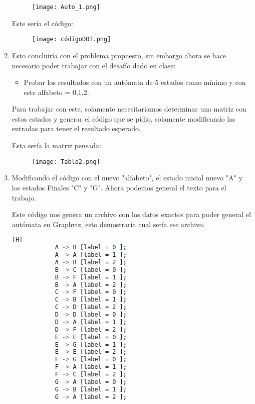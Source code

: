 \documentclass{article}
\begin{document}
\begin{enumerate}
        \begin{figure}[h]
           \centering
           \texttt{[image: Auto\_1.png]}
        \end{figure}

        Este sería el código:

        \begin{figure}[h]
           \centering
           \texttt{[image: códigoDOT.png]}
        \end{figure}

        \item Esto concluiría con el problema propuesto, sin embargo ahora se hace necesario poder trabajar con el desafío dado en clase:
          \begin{itemize}
              \item Probar los resultados con un autómata de 5 estados como mínimo y con este alfabeto = {0,1,2}.
          \end{itemize}

          Para trabajar con este, solamente necesitariamos determinar una matriz con estos estados y generar el código que se pidio, solamente modificando las entradas para tener el resultado esperado.

          \newpage

          Esta sería la matriz pensada:
          
          \begin{figure}[h]
           \centering
           \texttt{[image: Tabla2.png]}
        \end{figure}

        \item Modificando el código con el nuevo "alfabeto", el estado inicial nuevo "A" y los estados Finales "C" y "G". Ahora podemos general el texto para el trabajo.

        

        Este código nos genera un archivo con los datos exactos para poder general el autómata en Graphviz, esto demostraría cual sería ese archivo.
        
        \begin{lstlisting}[language=bash,caption={Definición del resultado esperado para Graphviz v.2 (7 Estados)}][H]
            A -> B [label = 0 ];
            A -> A [label = 1 ];
            A -> B [label = 2 ];
            B -> C [label = 0 ];
            B -> F [label = 1 ];
            B -> A [label = 2 ];
            C -> F [label = 0 ];
            C -> B [label = 1 ];
            C -> D [label = 2 ];
            D -> D [label = 0 ];
            D -> A [label = 1 ];
            D -> F [label = 2 ];
            E -> E [label = 0 ];
            E -> G [label = 1 ];
            E -> E [label = 2 ];
            F -> G [label = 0 ];
            F -> A [label = 1 ];
            F -> C [label = 2 ];
            G -> A [label = 0 ];
            G -> B [label = 1 ];
            G -> A [label = 2 ];
            

\end{lstlisting}
\end{enumerate}
\end{document}

